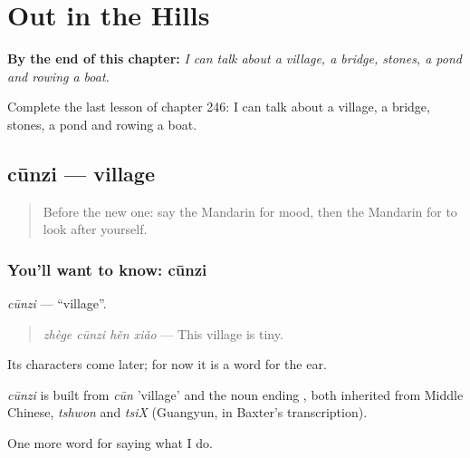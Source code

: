 
\chapter{Out in the Hills}
\label{ch:zh-out-in-the-hills}

\begin{chapteropening}
\textbf{By the end of this chapter:} \emph{I can talk about a village, a bridge, stones, a pond and rowing a boat.}

Complete the last lesson of chapter 246: I can talk about a village, a bridge, stones, a pond and rowing a boat.
\end{chapteropening}

\section[cūnzi]{cūnzi — village}

\label{lesson:ZH-C246-cunzi}



\begin{quote}
Before the new one: say the Mandarin for mood, then the Mandarin for to look after yourself.
\end{quote}

\subsection*{You'll want to know: cūnzi}
\emph{cūnzi} — \textquotedblleft{}village\textquotedblright{}.

\begin{quote}
\emph{zhège cūnzi hěn xiǎo} — This village is tiny.
\end{quote}

Its characters come later; for now it is a word for the ear.

\begin{cousinweb}
\emph{cūnzi} is built from \emph{cūn} 'village' and the noun ending , both inherited from Middle Chinese, \emph{tshwon} and \emph{tsiX} (Guangyun, in Baxter's transcription).
\end{cousinweb}

\begin{grammarlens}[title={What you've built}]
One more word for saying what I do.
\end{grammarlens}

